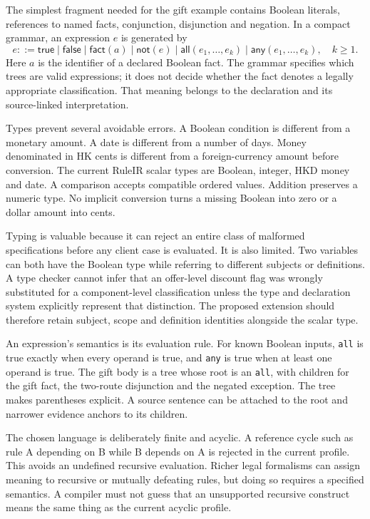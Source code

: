 \documentclass[12pt,a4paper,oneside,openany]{book}
\begin{document}
The simplest fragment needed for the gift example contains Boolean literals,
references to named facts, conjunction, disjunction and negation. In a compact
grammar, an expression $e$ is generated by
\begin{equation}
 e ::= \mathsf{true}\mid\mathsf{false}\mid\mathsf{fact}(a)
       \mid\mathsf{not}(e)\mid\mathsf{all}(e_1,\ldots,e_k)
       \mid\mathsf{any}(e_1,\ldots,e_k),\quad k\geq 1.
 \label{eq:boolean-grammar}
\end{equation}
Here $a$ is the identifier of a declared Boolean fact. The grammar specifies
which trees are valid expressions; it does not decide whether the fact denotes
a legally appropriate classification. That meaning belongs to the declaration
and its source-linked interpretation.

Types prevent several avoidable errors. A Boolean condition is different from
a monetary amount. A date is different from a number of days. Money denominated
in HK cents is different from a foreign-currency amount before conversion.
The current RuleIR scalar types are Boolean, integer, HKD money and date. A
comparison accepts compatible ordered values. Addition preserves a numeric
type. No implicit conversion turns a missing Boolean into zero or a dollar
amount into cents.

Typing is valuable because it can reject an entire class of malformed
specifications before any client case is evaluated. It is also limited. Two
variables can both have the Boolean type while referring to different subjects
or definitions. A type checker cannot infer that an offer-level discount flag
was wrongly substituted for a component-level classification unless the type
and declaration system explicitly represent that distinction. The proposed
extension should therefore retain subject, scope and definition identities
alongside the scalar type.

An expression's semantics is its evaluation rule. For known Boolean inputs,
\texttt{all} is true exactly when every operand is true, and \texttt{any} is true
when at least one operand is true. The gift body is a tree whose root is an
\texttt{all}, with children for the gift fact, the two-route disjunction and
the negated exception. The tree makes parentheses explicit. A source sentence
can be attached to the root and narrower evidence anchors to its children.

The chosen language is deliberately finite and acyclic. A reference cycle such
as rule A depending on B while B depends on A is rejected in the current
profile. This avoids an undefined recursive evaluation. Richer legal formalisms
can assign meaning to recursive or mutually defeating rules, but doing so
requires a specified semantics. A compiler must not guess that an unsupported
recursive construct means the same thing as the current acyclic profile.
\end{document}
